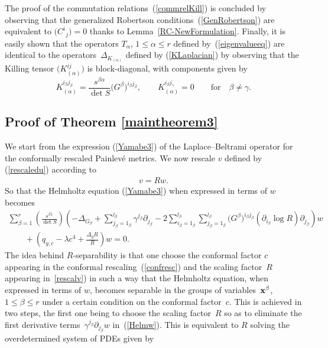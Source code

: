 \documentclass[pdftex]{sigma}
\numberwithin{equation}{section}
\newcommand{\jbeta}{j_{\beta}}
\newcommand{\lbeta}{l_{\beta}}
\newcommand{\ibeta}{i_{\beta}}
\begin{document}
The proof of the commutation relations~(\ref{commrelKill}) is concluded by observing that the generalized Robertson conditions~(\ref{GenRobertson}) are equivalent to $\big({C^{i}}_{j}\big)=0$ thanks to Lemma~\ref{RC-NewFormulation}. Finally, it is easily shown that the operators $T_{\alpha}$, $1\leq \alpha \leq r$ defined by~(\ref{eigenvalueeq}) are identical to the operators~$\Delta_{K_{(\alpha)}}$ defined by (\ref{KLaplacian}) by observing that the Killing tensor $\big(K_{(\alpha)}^{ij}\big)$ is block-diagonal, with components given by
\[
K_{(\alpha)}^{i_{\beta}j_{\beta}}=\frac{s^{\beta \alpha}}{\det S}\big(G^{\beta}\big)^{i_{\beta}j_{\beta}},\qquad K_{(\alpha)}^{i_{\beta}j_{\gamma}}=0\qquad \text{for}\quad \beta \neq \gamma.
\]

\subsection{Proof of Theorem \ref{maintheorem3}}
We start from the expression (\ref{Yamabe3}) of the Laplace--Beltrami operator for the conformally rescaled Painlev\'e metrics. We now rescale $v$ defined by (\ref{rescaledu}) according to
\begin{gather}\label{rescalv}
v=R w.
\end{gather}
So that the Helmholtz equation (\ref{Yamabe3}) when expressed in terms of $w$ becomes
\begin{gather}
\sum_{\beta=1}^{r}\left(\frac{s^{\beta 1}}{\det S}\right) \left(-\Delta_{G_{\beta}}+\sum_{\jbeta =1_{\beta}}^{\lbeta}\gamma^{\jbeta}\partial_{\jbeta}-2\sum_{\ibeta = 1_{\beta}}^{\lbeta}\sum_{\jbeta = 1_{\beta}}^{\lbeta}\big(G^{\beta}\big)^{\ibeta \jbeta}(\partial_{\ibeta}\log R) \partial_{\jbeta}\right)w\nonumber\\
\qquad{}  +\left(q_{g,c}-\lambda c^{4}+\frac{\Delta_{g}R}{R}\right)w=0.\label{Helmw}
\end{gather}
The idea behind $R$-separability is that one choose the conformal factor $c$ appearing in the conformal rescaling~(\ref{confresc}) and the scaling factor~$R$ appearing in~\ref{rescalv}) in such a way that the Helmholtz equation, when expressed in terms of $w$, becomes separable in the groups of variables~${\bf x}^{\beta}$, $1\leq \beta \leq r$ under a certain condition on the conformal factor~$c$. This is achieved in two steps, the first one being to choose the scaling factor~$R$ so as to eliminate the first derivative terms~$\gamma^{\jbeta}\partial_{\jbeta}w$ in~(\ref{Helmw}). This is equivalent to $R$ solving the overdetermined system of PDEs given by
\end{document}
